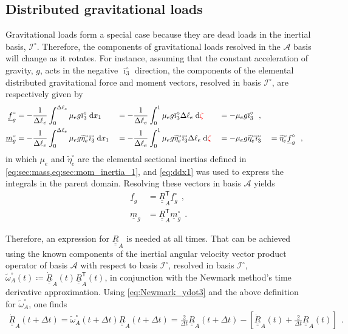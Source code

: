 \documentclass[12pt,a4paper,oneside,english]{abntex2} %
\newcommand{\fix}[1]{{\color{red}#1}}
\newcommand{\vect}[1]{\underline{#1}}
\newcommand{\uvec}[1]{\overline{#1}}
\def\tens#1{\underline{\underline{#1}}}
\def\til#1{\widetilde{#1}}
\def\lb{\left[}
\def\rb{\right]}
\def\T{\mathsf{T}}
\def\A{\mathcal{A}}
\def\Io{\mathcal{I}^{\circ}}
\def\xo{x_1}
\def\itho{\uvec{\imath}_3^{\circ}}
\def\R{\tens{R}}
\def\RA{\R_A}
\def\RAT{\R^\T_A}
\def\RAdot{\dot{\R}_A}
\def\omAtil{\til{\omega}_A}
\def\omAtilo{\omAtil^{\circ}}
\def\etatiloe{\til{\eta}_e^\circ}
\def\f{\vect{f}}
\def\m{\vect{m}}
\def\Deltal{\Delta \ell_e}
\def\d{\textnormal{d}}
\def\dt{\Delta t}
\def\todt{\frac{2}{\dt}}
\def\fg{\f_g}
\def\mg{\m_g}
\def\fgo{\fg^{\circ}}
\def\mgo{\mg^{\circ}}
\def\g{g}
\def\dt{\Delta t}
\begin{document}
\begin{apendicesenv}
\subsection{Distributed gravitational loads}
\label{subsec:weight_loads}

Gravitational loads form a special case because they are dead loads in the inertial basis, $\Io$. Therefore, the components of gravitational loads resolved in the $\A$ basis will change as it rotates. For instance, assuming that the constant acceleration of gravity, $\g$, acts in the negative $\itho$ direction, the components of the elemental distributed gravitational force and moment vectors, resolved in basis $\Io$, are respectively given by
\begin{alignat}{4}
    \fgo &= -\frac{1}{\Deltal}\int_{0}^{\Deltal}\mu_e\g\itho\;\d\xo
    &&= -\frac{1}{\Deltal}\int_{0}^{1}\mu_e\g\itho\Deltal\;\d\fix{\zeta} 
    &&= -\mu_e\g\itho  \ \ ,
    \label{eq:fgo} 
    \\
    \mgo &= -\frac{1}{\Deltal}\int_{0}^{\Deltal}\mu_e\g\etatiloe\itho\;\d\xo 
    &&= -\frac{1}{\Deltal}\int_{0}^{1}\mu_e\g\etatiloe\itho\Deltal\;\d\fix{\zeta} 
    &&= -\mu_e\g\etatiloe\itho 
    &&= \etatiloe\fgo \ \ ,
    \label{eq:mgo}
\end{alignat}
in which $\mu_e$ and $\etatiloe$ are the elemental sectional inertias defined in \cref{eq:sec:mass,eq:sec:mom_inertia_1}, and \cref{eq:ddx1} was used to express the integrals in the parent domain. Resolving these vectors in basis $\A$ yields
\begin{align}
    \fg &= \RAT\fgo \ \ ,
    \label{eq:fg}
    \\
    \mg  &= \RAT\mgo \ \ .
    \label{eq:mg}
\end{align}

Therefore, an expression for $\RA$ is needed at all times. That can be achieved using the known components of the inertial angular velocity vector product operator of basis $\A$ with respect to basis $\Io$, resolved in basis $\Io$, $\omAtilo(t) \coloneqq \RAdot(t)\RAT(t)$, in conjunction with the Newmark method's time derivative approximation. Using \cref{eq:Newmark_ydot3} and the above definition for $\omAtilo$, one finds
\begin{align}
    \RAdot(t+\dt) = \omAtilo(t+\dt)\RA(t+\dt) = \todt \RA(t+\dt) - \lb \RAdot(t) + \todt \RA(t) \rb  \ \ .
    \label{eq:RAdot}
\end{align}


\end{apendicesenv}
\end{document}
